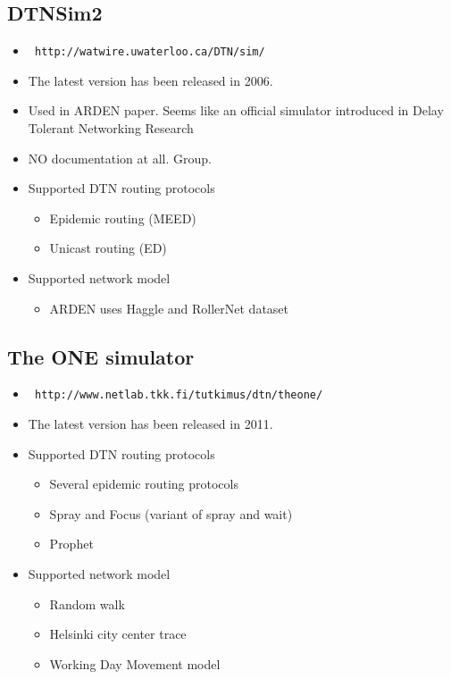\documentclass[11pt]{article}
\begin{document}
\subsection{DTNSim2}
\begin{itemize}
\item \begin{verbatim} http://watwire.uwaterloo.ca/DTN/sim/ \end{verbatim}
\item The latest version has been released in 2006.
\item Used in ARDEN paper.  Seems like an official simulator introduced in Delay Tolerant Networking Research 
\item NO documentation at all.
Group.
\item Supported DTN routing protocols
  \begin{itemize}
  \item Epidemic routing (MEED)
  \item Unicast routing (ED)
  \end{itemize}

\item Supported network model
  \begin{itemize}
  \item ARDEN uses Haggle and RollerNet dataset
  \end{itemize}
\end{itemize}


\subsection{The ONE simulator}
\begin{itemize}
\item \begin{verbatim} http://www.netlab.tkk.fi/tutkimus/dtn/theone/ \end{verbatim}
\item The latest version has been released in 2011.
\item Supported DTN routing protocols
  \begin{itemize}
  \item Several epidemic routing protocols
  \item Spray and Focus (variant of spray and wait)
  \item Prophet
  \end{itemize}

\item Supported network model
  \begin{itemize}
  \item Random walk
  \item Helsinki city center trace
  \item Working Day Movement model
  \end{itemize}

\end{itemize}
\end{document}
